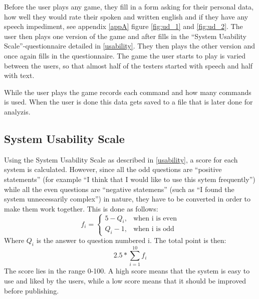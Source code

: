Before the user plays any game, they fill in a form asking for their personal data, how well they would rate their spoken and written english and if they have any speech impediment, see appendix \ref{appA} figure \ref{fig:ud_1} and \ref{fig:ud_2}. The user then plays one version of the game and after fills in the ``System Usability Scale''-questionnaire detailed in \ref{usability}. They then plays the other version and once again fills in the questionnaire. The game the user starts to play is varied between the users, so that almost half of the testers started with speech and half with text.

While the user plays the game records each command and how many commands is used. When the user is done this data gets saved to a file that is later done for analyzis.

\subsection{System Usability Scale} \label{sec:sus}
Using the System Usability Scale as described in \ref{usability}, a score for each system is calculated. However, since all the odd questions are ``positive statements'' (for example ``I think that I would like to use this sytem frequently'') while all the even questions are ``negative statemens'' (such as ``I found the system unnecessarily complex'') in nature, they have to be converted in order to make them work together. This is done as follows: 
\begin{equation} \label{eq:convert}
	    f_{i} = 
	\begin{cases} 
	    5 - Q_{i}, & \text{when i is even}\\
	    Q_{i} - 1, & \text{when i is odd}
	\end{cases}
\end{equation}
Where \(Q_{i} \) is the answer to question numbered i. The total point is then: 
\begin{equation} \label{eq:sum}
	2.5 * \displaystyle \sum_{i=1}^{10} f_{i} 
\end{equation}
The score lies in the range 0-100. A high score means that the system is easy to use and liked by the users, while a low score means that it should be improved before publishing. \citep{Broo}
